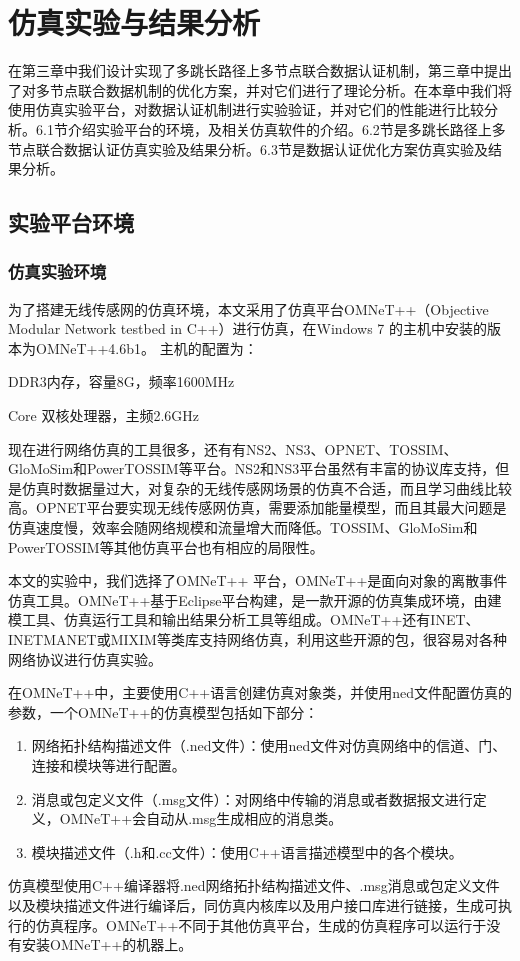 \chapter{仿真实验与结果分析}
在第三章中我们设计实现了多跳长路径上多节点联合数据认证机制，第三章中提出了对多节点联合数据机制的优化方案，并对它们进行了理论分析。在本章中我们将使用仿真实验平台，对数据认证机制进行实验验证，并对它们的性能进行比较分析。6.1节介绍实验平台的环境，及相关仿真软件的介绍。6.2节是多跳长路径上多节点联合数据认证仿真实验及结果分析。6.3节是数据认证优化方案仿真实验及结果分析。
\section{实验平台环境}
\subsection{仿真实验环境}
为了搭建无线传感网的仿真环境，本文采用了仿真平台OMNeT++（Objective Modular Network testbed in C++）进行仿真，在Windows 7 的主机中安装的版本为OMNeT++4.6b1。 主机的配置为：
\begin{compactitem}
  \item DDR3内存，容量8G，频率1600MHz
  \item Core 双核处理器，主频2.6GHz
\end{compactitem}

现在进行网络仿真的工具很多，还有有NS2、NS3、OPNET、TOSSIM、GloMoSim和PowerTOSSIM等平台。NS2和NS3平台虽然有丰富的协议库支持，但是仿真时数据量过大，对复杂的无线传感网场景的仿真不合适，而且学习曲线比较高。OPNET平台要实现无线传感网仿真，需要添加能量模型，而且其最大问题是仿真速度慢，效率会随网络规模和流量增大而降低。TOSSIM、GloMoSim和PowerTOSSIM等其他仿真平台也有相应的局限性。

本文的实验中，我们选择了OMNeT++ 平台，OMNeT++是面向对象的离散事件仿真工具。OMNeT++基于Eclipse平台构建，是一款开源的仿真集成环境，由建模工具、仿真运行工具和输出结果分析工具等组成。OMNeT++还有INET、INETMANET或MIXIM等类库支持网络仿真，利用这些开源的包，很容易对各种网络协议进行仿真实验。

在OMNeT++中，主要使用C++语言创建仿真对象类，并使用ned文件配置仿真的参数，一个OMNeT++的仿真模型包括如下部分：
\begin{enumerate}\setlength{\itemsep}{-\itemsep}
  \item 网络拓扑结构描述文件（.ned文件）：使用ned文件对仿真网络中的信道、门、连接和模块等进行配置。
  \item 消息或包定义文件（.msg文件）：对网络中传输的消息或者数据报文进行定义，OMNeT++会自动从.msg生成相应的消息类。
  \item 模块描述文件（.h和.cc文件）：使用C++语言描述模型中的各个模块。
\end{enumerate}
仿真模型使用C++编译器将.ned网络拓扑结构描述文件、.msg消息或包定义文件以及模块描述文件进行编译后，同仿真内核库以及用户接口库进行链接，生成可执行的仿真程序。OMNeT++不同于其他仿真平台，生成的仿真程序可以运行于没有安装OMNeT++的机器上。

